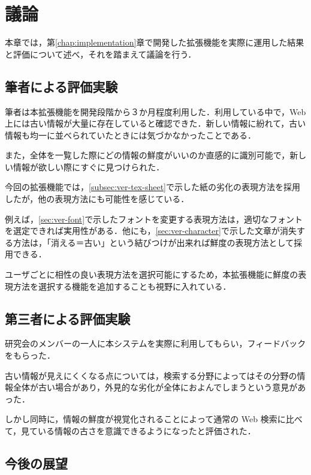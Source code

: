 \chapter{議論}
\label{chap:discussion}

本章では，第\ref{chap:implementation}章で開発した拡張機能を実際に運用した結果と評価について述べ，それを踏まえて議論を行う．

\newpage

\section{筆者による評価実験}

筆者は本拡張機能を開発段階から３か月程度利用した．利用している中で，Web 上には古い情報が大量に存在していると確認できた．新しい情報に紛れて，古い情報も均一に並べられていたときには気づかなかったことである．

また，全体を一覧した際にどの情報の鮮度がいいのか直感的に識別可能で，新しい情報が欲しい際にすぐに見つけられた．

今回の拡張機能では，\ref{subsec:ver-tex-sheet}で示した紙の劣化の表現方法を採用したが，他の表現方法にも可能性を感じている．

例えば，\ref{sec:ver-font}で示したフォントを変更する表現方法は，適切なフォントを選定できれば実用性がある．他にも，\ref{sec:ver-character}で示した文章が消失する方法は，「消える＝古い」という結びつけが出来れば鮮度の表現方法として採用できる．

ユーザごとに相性の良い表現方法を選択可能にするため，本拡張機能に鮮度の表現方法を選択する機能を追加することも視野に入れている．

\section{第三者による評価実験}
\label{sec:dis_third}

研究会のメンバーの一人に本システムを実際に利用してもらい，フィードバックをもらった．

古い情報が見えにくくなる点については，検索する分野によってはその分野の情報全体が古い場合があり，外見的な劣化が全体におよんでしまうという意見があった．

しかし同時に，情報の鮮度が視覚化されることによって通常の Web 検索に比べて，見ている情報の古さを意識できるようになったと評価された．

\section{今後の展望}

